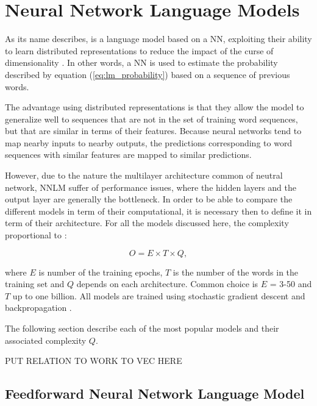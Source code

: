 \section{Neural Network Language Models}
\label{sec:nnlms-intro}

As its name describes, is a language model based on a \ac{NN}, exploiting their
ability to learn distributed representations to reduce the impact of the
curse of dimensionality \cite{Bengio:2008}. In other words, a \ac{NN} is
used to estimate the probability described  by equation (\ref{eq:lm_probability}) based on a sequence of
previous words.

The advantage  using  distributed representations  is that they allow
the model to generalize well to sequences that are not in the set of training
word sequences, but that are similar in terms of their features. Because neural networks tend to map nearby inputs
to nearby outputs, the predictions corresponding to word sequences with
similar features are mapped to similar predictions. \cite{Bengio:2008,Bengio:2003:NPL:944919.944966}

However, due to the nature the multilayer architecture common of neutral
network, \ac{NNLM}  suffer of 
performance issues, where the hidden layers and the output layer are
generally the bottleneck. In order to be able to compare the different
models in term of their computational, it is necessary then to define it in
term of their architecture. For all the models discussed here, the  complexity proportional to \cite{DBLP:journals/corr/abs-1301-3781}:

\begin{center}
\begin{equation} O = E \times T \times Q,   \end{equation}
\end{center}

where $E$ is number of the training epochs, $T$ is the number of the words in
the training set and $Q$ depends on each architecture. Common choice is $E$ = 3-50 and $T$ up to one billion.
All models are trained using stochastic gradient descent and backpropagation
\cite{Bengio:2003:NPL:944919.944966,DBLP:journals/corr/abs-1301-3781}.

The following section describe each of the most popular models and their
associated complexity $Q$.


PUT RELATION TO WORK TO VEC HERE
\subsection{Feedforward Neural Network Language Model}
\label{subsec:fwd-neural-net-lm}


